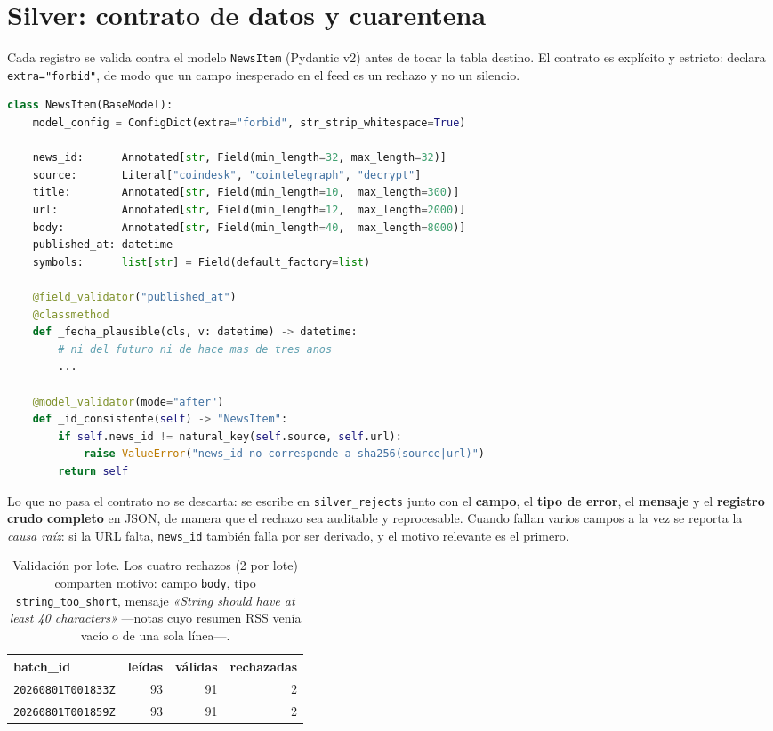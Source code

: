 \documentclass[11pt,a4paper]{article}
\begin{document}
\section{Silver: contrato de datos y cuarentena}

Cada registro se valida contra el modelo \texttt{NewsItem} (Pydantic v2) antes
de tocar la tabla destino. El contrato es explícito y estricto: declara
\texttt{extra="forbid"}, de modo que un campo inesperado en el feed es un
rechazo y no un silencio.

\begin{lstlisting}[language=Python, caption={Contrato de datos (extracto de \texttt{contracts.py}).}]
class NewsItem(BaseModel):
    model_config = ConfigDict(extra="forbid", str_strip_whitespace=True)

    news_id:      Annotated[str, Field(min_length=32, max_length=32)]
    source:       Literal["coindesk", "cointelegraph", "decrypt"]
    title:        Annotated[str, Field(min_length=10,  max_length=300)]
    url:          Annotated[str, Field(min_length=12,  max_length=2000)]
    body:         Annotated[str, Field(min_length=40,  max_length=8000)]
    published_at: datetime
    symbols:      list[str] = Field(default_factory=list)

    @field_validator("published_at")
    @classmethod
    def _fecha_plausible(cls, v: datetime) -> datetime:
        # ni del futuro ni de hace mas de tres anos
        ...

    @model_validator(mode="after")
    def _id_consistente(self) -> "NewsItem":
        if self.news_id != natural_key(self.source, self.url):
            raise ValueError("news_id no corresponde a sha256(source|url)")
        return self
\end{lstlisting}

Lo que no pasa el contrato no se descarta: se escribe en
\texttt{silver\_rejects} junto con el \textbf{campo}, el \textbf{tipo de error},
el \textbf{mensaje} y el \textbf{registro crudo completo} en JSON, de manera que
el rechazo sea auditable y reprocesable. Cuando fallan varios campos a la vez se
reporta la \emph{causa raíz}: si la URL falta, \texttt{news\_id} también falla
por ser derivado, y el motivo relevante es el primero.

\begin{table}[h]
\centering\small
\caption{Validación por lote. Los cuatro rechazos (2 por lote) comparten motivo:
campo \texttt{body}, tipo \texttt{string\_too\_short}, mensaje \emph{«String should
have at least 40 characters»} ---notas cuyo resumen RSS venía vacío o de una
sola línea---.}
\begin{tabular}{@{}lrrr@{}}
\toprule
\textbf{batch\_id} & \textbf{leídas} & \textbf{válidas} & \textbf{rechazadas} \\
\midrule
\texttt{20260801T001833Z} & 93 & 91 & 2 \\
\texttt{20260801T001859Z} & 93 & 91 & 2 \\
\bottomrule
\end{tabular}
\end{table}
\end{document}
